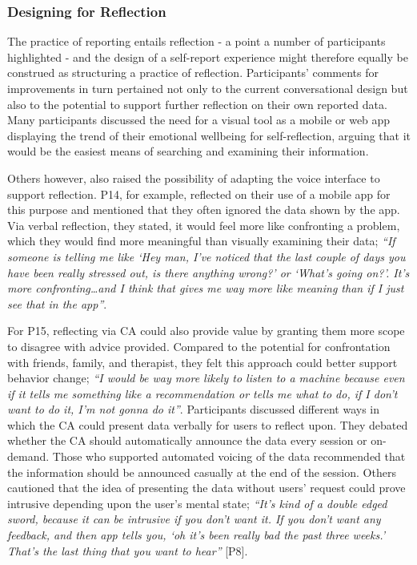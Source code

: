         \subsubsection{Designing for Reflection}\label{sec:reflection}
        
            The practice of reporting entails reflection - a point a number of participants highlighted - and the design of a self-report experience might therefore equally be construed as structuring a practice of reflection. Participants' comments for improvements in turn pertained not only to the current conversational design but also to the potential to support further reflection on their own reported data. Many participants discussed the need for a visual tool as a mobile or web app displaying the trend of their emotional wellbeing for self-reflection, arguing that it would be the easiest means of searching and examining their information.
                   
            Others however, also raised the possibility of adapting the voice interface to support reflection. P14, for example, reflected on their use of a mobile app for this purpose and mentioned that they often ignored the data shown by the app. Via verbal reflection, they stated, it would feel more like confronting a problem, which they would find more meaningful than visually examining their data; \textit{``If someone is telling me like `Hey man, I've noticed that the last couple of days you have been really stressed out, is there anything wrong?' or `What's going on?'. It's more confronting\ldots and I think that gives me way more like meaning than if I just see that in the app''}.
            
            For P15, reflecting via \ac{CA} could also provide value by granting them more scope to disagree with advice provided. Compared to the potential for confrontation with friends, family, and therapist, they felt this approach could better support behavior change; \textit{``I would be way more likely to listen to a machine because even if it tells me something like a recommendation or tells me what to do, if I don't want to do it, I'm not gonna do it''}. Participants discussed different ways in which the \ac{CA} could present data verbally for users to reflect upon. They debated whether the \ac{CA} should automatically announce the data every session or on-demand. Those who supported automated voicing of the data recommended that the information should be announced casually at the end of the session. Others cautioned that the idea of presenting the data without users' request could prove intrusive depending upon the user's mental state; \textit{``It's kind of a double edged sword, because it can be intrusive if you don't want it. If you don't want any feedback, and then \acl{app} tells you, `oh it's been really bad the past three weeks.' That's the last thing that you want to hear''} [P8].
            
